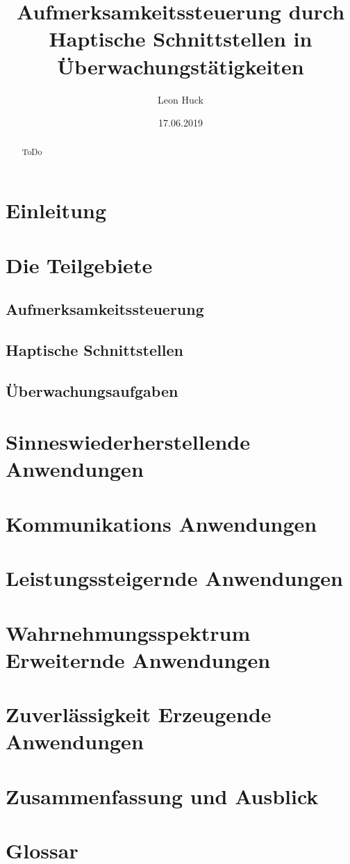 \documentclass{llncs}					%
\title{Aufmerksamkeitssteuerung durch Haptische Schnittstellen in Überwachungstätigkeiten}
\author{Leon Huck}
\institute{Karlsruher Institut für Technology}
\date{17.06.2019}
\begin{document}
	
\maketitle

\begin{abstract}
	ToDo
\end{abstract}

\newpage
\tableofcontents
\newpage

\newpage
\section{Einleitung}

\section{Die Teilgebiete}
\subsection{Aufmerksamkeitssteuerung}
\subsection{Haptische Schnittstellen}
\subsection{Überwachungsaufgaben}

\section{Sinneswiederherstellende Anwendungen}

\section{Kommunikations Anwendungen}

\section{Leistungssteigernde Anwendungen}

\section{Wahrnehmungsspektrum Erweiternde Anwendungen}

\section{Zuverlässigkeit Erzeugende Anwendungen}

\section{Zusammenfassung und Ausblick}

\clearpage
\section{Glossar}\label{glossar}

\renewcommand*{\glossarysection}[2][]{}	%
\printnoidxglossaries				%

\clearpage

\end{document}
